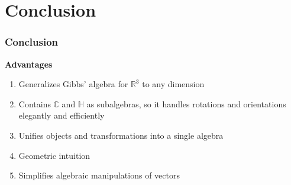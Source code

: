 \documentclass{beamer}
\newcommand{\R}{\mathbb{R}}
\newcommand{\C}{\mathbb{C}}
\newcommand{\HM}{\mathbb{H}}
\begin{document}

\section{Conclusion}
\begin{frame}
\frametitle{Conclusion}
    \textbf{Advantages}
    \begin{enumerate}
        \item Generalizes Gibbs' algebra for $\R^3$ to any dimension
        \pause
        \item Contains $\C$ and $\HM$ as subalgebras, so it handles rotations and orientations elegantly and efficiently
        \pause
        \item Unifies objects and transformations into a single algebra
        \pause
        \item Geometric intuition
        \pause
        \item Simplifies algebraic manipulations of vectors
    \end{enumerate}
\end{frame}
\end{document}
